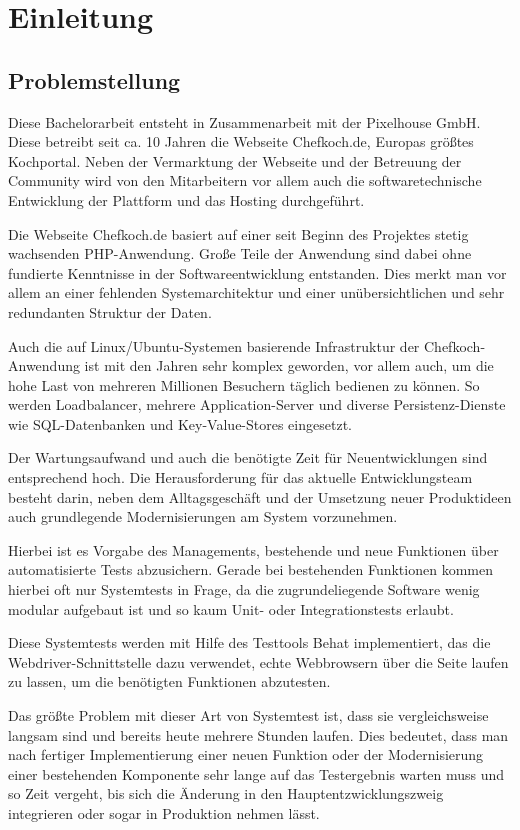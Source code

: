 \section{Einleitung}

\subsection{Problemstellung}

Diese Bachelorarbeit entsteht in Zusammenarbeit mit der Pixelhouse GmbH. Diese betreibt seit ca. 10 Jahren die Webseite Chefkoch.de, Europas größtes Kochportal. Neben der Vermarktung der Webseite und der Betreuung der Community wird von den Mitarbeitern vor allem auch die softwaretechnische Entwicklung der Plattform und das Hosting durchgeführt.

Die Webseite Chefkoch.de basiert auf einer seit Beginn des Projektes stetig wachsenden PHP-Anwendung. Große Teile der Anwendung sind dabei ohne fundierte Kenntnisse in der Softwareentwicklung entstanden. Dies merkt man vor allem an einer fehlenden Systemarchitektur und einer unübersichtlichen und sehr redundanten Struktur der Daten.

Auch die auf Linux/Ubuntu-Systemen basierende Infrastruktur der Chefkoch-Anwendung ist mit den Jahren sehr komplex geworden, vor allem auch, um die hohe Last von mehreren Millionen Besuchern täglich bedienen zu können. So werden Loadbalancer, mehrere Application-Server und diverse Persistenz-Dienste wie SQL-Datenbanken und Key-Value-Stores eingesetzt.

Der Wartungsaufwand und auch die benötigte Zeit für Neuentwicklungen sind entsprechend hoch. Die Herausforderung für das aktuelle Entwicklungsteam besteht darin, neben dem Alltagsgeschäft und der Umsetzung neuer Produktideen auch grundlegende Modernisierungen am System vorzunehmen.

Hierbei ist es Vorgabe des Managements, bestehende und neue Funktionen über automatisierte Tests abzusichern. Gerade bei bestehenden Funktionen kommen hierbei oft nur Systemtests in Frage, da die zugrundeliegende Software wenig modular aufgebaut ist und so kaum Unit- oder Integrationstests erlaubt.

Diese Systemtests werden mit Hilfe des Testtools Behat implementiert, das die Webdriver-Schnittstelle dazu verwendet, echte Webbrowsern über die Seite laufen zu lassen, um die benötigten Funktionen abzutesten.

Das größte Problem mit dieser Art von Systemtest ist, dass sie vergleichsweise langsam sind und bereits heute mehrere Stunden laufen. Dies bedeutet, dass man nach fertiger Implementierung einer neuen Funktion oder der Modernisierung einer bestehenden Komponente sehr lange auf das Testergebnis warten muss und so Zeit vergeht, bis sich die Änderung in den Hauptentzwicklungszweig integrieren oder sogar in Produktion nehmen lässt.

